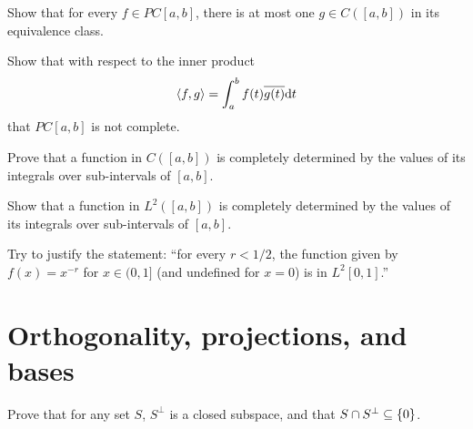\documentclass[11pt,a4paper]{article}
\begin{document}
\begin{exercise}
  Show that for every $f \in PC[a, b]$,
  there is at most one $g \in C([a, b])$ in its equivalence class.
\end{exercise}
\begin{solution}

\end{solution}

\begin{exercise}
  Show that with respect to the inner product
  \[
    \left\langle f, g \right\rangle = \int_{a}^{b} f(t) \overline{g(t)} \mathrm{d} t
  \]
  that $PC[a, b]$ is not complete.
\end{exercise}
\begin{solution}

\end{solution}

\begin{exercise}
  Prove that a function in $C([a,b])$ is completely determined by the values of
  its integrals over sub-intervals of $[a,b]$.
\end{exercise}
\begin{solution}

\end{solution}

\begin{exercise}
  Show that a function in $L^2([a,b])$
  is completely determined by the values of
  its integrals over sub-intervals of $[a,b]$.
\end{exercise}
\begin{solution}

\end{solution}

\begin{exercise}[tricky]
  Try to justify the statement: ``for every $r < 1/2$,
  the function given by $f(x) = x^{-r}$ for $x \in (0, 1]$
  (and undefined for $x = 0$) is in $L^2[0,1]$.''
\end{exercise}
\begin{solution}

\end{solution}


\newpage

\section{Orthogonality, projections, and bases}

\begin{exercise}
  Prove that for any set $S$, $S^{\perp}$ is a closed subspace,
  and that $S \cap S^{\perp} \subseteq \left\{0\right\}$.
\end{exercise}
\begin{solution}

\end{solution}
\end{document}
